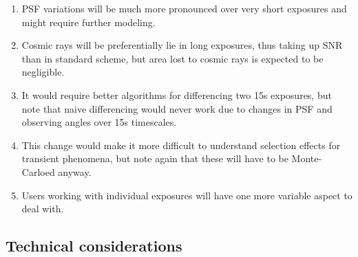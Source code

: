 \documentclass[12pt, a4paper]{article}
\begin{document}
\begin{enumerate}


\item PSF variations will be much more pronounced over very short
  exposures and might require further modeling. 

\item Cosmic rays will be preferentially lie in long exposures,
  thus taking up SNR than in standard scheme, but area lost to cosmic
  rays is expected to be negligible.


\item It would require better algorithms for differencing two 15s
  exposures, but note that naive differencing would never work due to
  changes in PSF and observing angles over 15s timescales.

\item This change would make it more difficult to understand selection
  effects for transient phenomena, but note again that these will have
  to be Monte-Carloed anyway.

\item Users working with individual exposures will have one more
  variable aspect to deal with.

\end{enumerate}

\subsection*{Technical considerations}
\end{document}
